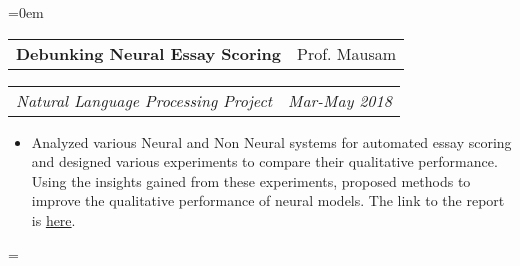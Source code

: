 \documentclass{article}
\makeatletter
\newenvironment{longversion}{}{} %
\newenvironment{absolutelynopagebreak}
  {\par\nobreak\vfil\penalty0\vfilneg
   \vtop\bgroup}
  {\par\xdef\tpd{\the\prevdepth}\egroup
   \prevdepth=\tpd}
\newcommand{\headerrow}[2]
{\begin{tabular*}{\linewidth}{l@{\extracolsep{\fill}}r}
	#1 &
	#2 \\
\end{tabular*}}
\makeatother
\begin{document}
\begin{absolutelynopagebreak}
\begin{longversion}
\begin{list} {}{\leftmargin=0em}
\item[]
\headerrow {\textbf{Debunking Neural Essay Scoring}}{Prof. Mausam}
\headerrow {\emph{Natural Language Processing Project}}{\emph{Mar-May 2018}}
\begin{itemize} \item[] 
Analyzed various Neural and Non Neural systems for automated essay scoring and designed various experiments to compare their qualitative performance. Using the insights gained from these experiments, proposed methods to improve the qualitative performance of neural models. The link to the report is \href{https://www.cse.iitd.ac.in/~cs1150262/nlp.pdf}{here}.
\end{itemize}






\end{list}
\end{longversion}
\end{absolutelynopagebreak}
\end{document}
